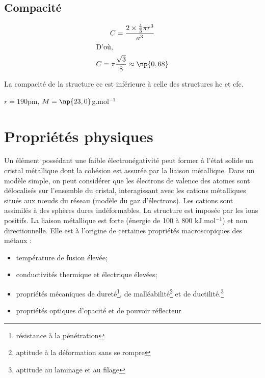 \subsection{Compacité}
\begin{gather}
    C = \frac{2\times \frac{4}{3} \pi r^3}{a^3}\\
    \intertext{D'où,}
    C = \pi \frac{\sqrt{3}}{8} \approx \np{0,68}
\end{gather}
\begin{rem}
    La compacité de la structure cc est inférieure à celle
    des structures hc et cfc.
\end{rem}
\begin{ex}[Na]
    $r = 190$pm, $M = \np{23,0}$g.mol$^{-1}$
\end{ex}

\section{Propriétés physiques}
Un élément possédant une faible électronégativité peut former
à l’état solide un cristal métallique dont la cohésion est
assurée par la liaison métallique.
Dans un modèle simple, on peut considérer que les électrons
de valence des atomes sont délocalisés sur l’ensemble du
cristal, interagissant avec les cations métalliques situés
aux n\oe uds du réseau (modèle du gaz d’électrons).
Les cations sont assimilés à des sphères dures
indéformables. La structure est imposée par les ions positifs.
La liaison métallique est forte (énergie de 100 à 800 kJ.mol$^{-1}$)
et non directionnelle. Elle est à l’origine de certaines
propriétés macroscopiques des métaux :
\begin{itemize}
    \item température de fusion élevée; 
    \item conductivités thermique et électrique élevées;
    \item propriétés mécaniques de dureté\footnote{résistance à
        la pénétration}, de malléabilité\footnote{aptitude à la
        déformation sans se rompre} et de
        ductilité.\footnote{aptitude au laminage et au filage}
    \item propriétés optiques d'opacité et de pouvoir réflecteur
\end{itemize}

